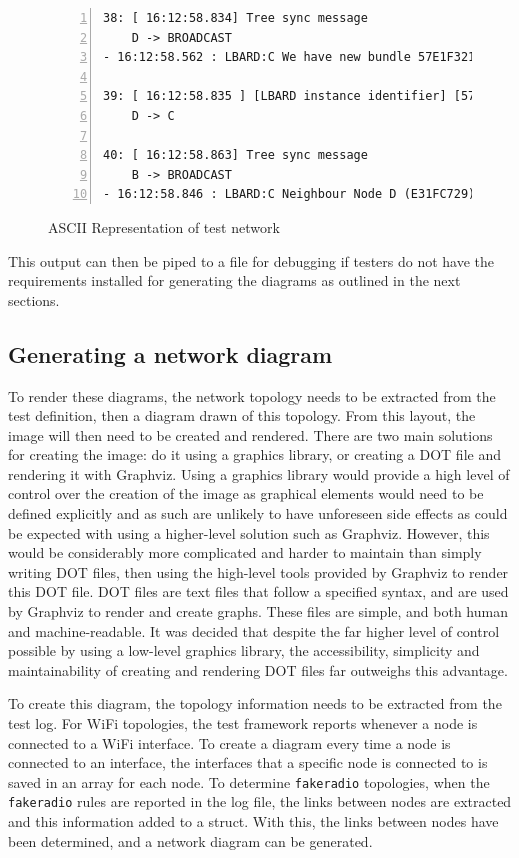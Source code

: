 \begin{figure}
    \begin{centering}
\begin{lstlisting}[numbers=left, basicstyle=\small, frame=single, breaklines, ]
38: [ 16:12:58.834] Tree sync message
    D -> BROADCAST
- 16:12:58.562 : LBARD:C We have new bundle 57E1F321*

39: [ 16:12:58.835 ] [LBARD instance identifier] [57 bytes]
    D -> C

40: [ 16:12:58.863] Tree sync message
    B -> BROADCAST
- 16:12:58.846 : LBARD:C Neighbour Node D (E31FC729) is missing bundle 57E1F321*
\end{lstlisting}
    \caption{ASCII Representation of test network}
    \label{fig:chapter5ASCIIRep}
    \end{centering}
\end{figure}
This output can then be piped to a file for debugging if testers do not have the requirements installed for generating the diagrams as outlined in the next sections.


\subsection{Generating a network diagram}
To render these diagrams, the network topology needs to be extracted from the test definition, then a diagram drawn of this topology.
From this layout, the image will then need to be created and rendered.
There are two main solutions for creating the image: do it using a graphics library, or creating a DOT file and rendering it with Graphviz.
Using a graphics library would provide a high level of control over the creation of the image as graphical elements would need to be defined explicitly and as such are unlikely to have unforeseen side effects as could be expected with using a higher-level solution such as Graphviz.
However, this would be considerably more complicated and harder to maintain than simply writing DOT files, then using the high-level tools provided by Graphviz to render this DOT file.
DOT files are text files that follow a specified syntax, and are used by Graphviz to render and create graphs.
These files are simple, and both human and machine-readable. 
It was decided that despite the far higher level of control possible by using a low-level graphics library, the accessibility, simplicity and maintainability of creating and rendering DOT files far outweighs this advantage.

To create this diagram, the topology information needs to be extracted from the test log.
For WiFi topologies, the test framework reports whenever a node is connected to a WiFi interface.
To create a diagram every time a node is connected to an interface, the interfaces that a specific node is connected to is saved in an array for each node.
To determine \texttt{fakeradio} topologies, when the \texttt{fakeradio} rules are reported in the log file, the links between nodes are extracted and this information added to a struct.
With this, the links between nodes have been determined, and a network diagram can be generated.

